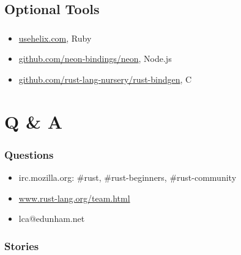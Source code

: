 \documentclass{beamer}
\begin{document}
\subsection{Optional Tools}

\begin{frame}[fragile]
\tableofcontents[currentsubsection]
\end{frame}


\begin{frame}[fragile]
\frametitle{\insertsubsectionhead}

\begin{itemize}[<+(1)->]
\item \url{usehelix.com}, Ruby
\item \url{github.com/neon-bindings/neon}, Node.js
\item \url{github.com/rust-lang-nursery/rust-bindgen}, C
\end{itemize}

\end{frame}

\section{Q \& A}

\begin{frame}[fragile]
\tableofcontents [currentsection]
\end{frame}

\begin{frame}[fragile]
\frametitle{Questions}
\begin{itemize}[<+(1)->]
\item irc.mozilla.org: \#rust, \#rust-beginners, \#rust-community
\item \url{www.rust-lang.org/team.html}
\item lca$@$edunham.net
\end{itemize}
\end{frame}

\begin{frame}[fragile]
\frametitle{Stories}
\end{frame}
\end{document}
